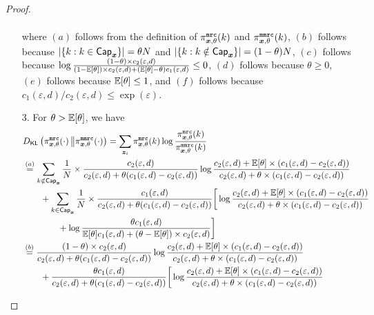 \begin{proof}
\begin{enumerate}
\begin{align}
\end{align}
where $(a)$ follows from the definition of $\pi^{\texttt{mrc}}_{{\boldsymbol{x}}, \theta}(k)$ and $\pi^{\texttt{mmrc}}_{{\boldsymbol{x}}, \theta}(k)$, $(b)$ follows because $|\{k : k \in \mathsf{Cap}_{{\boldsymbol{x}}}\}| = \theta N$ and $|\{k : k \notin \mathsf{Cap}_{{\boldsymbol{x}}}\}| = (1-\theta) N$, $(c)$ follows because $\log \frac{(1-\theta) \times c_2(\varepsilon,d)}{ (1-\mathbb{E}[\theta]) \times c_2(\varepsilon,d) + (\mathbb{E}[\theta] - \theta) c_1(\varepsilon,d)} \leq 0$, $(d)$ follows because $\theta \geq 0$, $(e)$ follows because $\mathbb{E}[\theta] \leq 1$, and $(f)$ follows because $c_1(\varepsilon,d) / c_2(\varepsilon,d) \leq \exp{(\varepsilon)}$.

\item[3.]
For $\theta > \mathbb{E}[\theta]$, we have
\begin{align}
  & \KLD{\piMRC_{\svbx, \theta}(\cdot)}{\piMMRC_{\svbx, \theta}(\cdot)} = \sum_{\svbz_i} \piMRC_{\svbx, \theta}(k) \log \dfrac{\piMRC_{\svbx, \theta}(k)}{\piMMRC_{\svbx, \theta}(k)} \\
  & \stackrel{(a)}{=} \sum_{k \notin \msf{Cap}_{\svbx}} \frac{1}{N} \times  \dfrac{c_2(\varepsilon,d)}{c_2(\varepsilon,d) +  \theta (c_1(\varepsilon,d) - c_2(\varepsilon,d))} \log \dfrac{c_2(\varepsilon,d) + \Expectation[\theta] \times (c_1(\varepsilon,d) - c_2(\varepsilon,d))}{c_2(\varepsilon,d) +  \theta \times (c_1(\varepsilon,d) - c_2(\varepsilon,d))} \\ 
    & \qquad +  \sum_{k \in \msf{Cap}_{\svbx}} \frac{1}{N} \times  \dfrac{c_1(\varepsilon,d)}{c_2(\varepsilon,d) +  \theta (c_1(\varepsilon,d) - c_2(\varepsilon,d))} \bigg[ \log \dfrac{c_2(\varepsilon,d)+ \Expectation[\theta] \times (c_1(\varepsilon,d) - c_2(\varepsilon,d))}{c_2(\varepsilon,d) +  \theta \times (c_1(\varepsilon,d) - c_2(\varepsilon,d))} \\
    &  \qquad \qquad + \log \dfrac{\theta c_1(\varepsilon,d)}{\Expectation[\theta] c_1(\varepsilon,d) + (\theta - \Expectation[\theta]) \times c_2(\varepsilon,d)} \bigg] \\
    & \stackrel{(b)}{=}   \dfrac{(1-\theta) \times c_2(\varepsilon,d)}{c_2(\varepsilon,d) +  \theta (c_1(\varepsilon,d) - c_2(\varepsilon,d))} \log \dfrac{c_2(\varepsilon,d) + \Expectation[\theta] \times (c_1(\varepsilon,d) - c_2(\varepsilon,d))}{c_2(\varepsilon,d) +  \theta \times (c_1(\varepsilon,d) - c_2(\varepsilon,d))} \\ 
    & \qquad + \dfrac{\theta c_1(\varepsilon,d)}{c_2(\varepsilon,d) +  \theta (c_1(\varepsilon,d) - c_2(\varepsilon,d))} \bigg[ \log \dfrac{c_2(\varepsilon,d)+ \Expectation[\theta] \times (c_1(\varepsilon,d) - c_2(\varepsilon,d))}{c_2(\varepsilon,d) +  \theta \times (c_1(\varepsilon,d) - c_2(\varepsilon,d))}  \\

\end{align}
\end{enumerate}
\end{proof}
